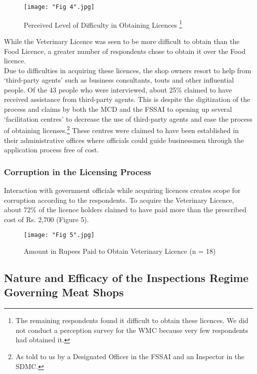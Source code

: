 \documentclass[a4paper, 12pt]{article}
\begin{document}
\begin{figure}[H]
\centering
\texttt{[image: "Fig 4".jpg]}
\caption[Perceived Level of Difficulty in Obtaining Licences] {Perceived Level of Difficulty in Obtaining Licences \footnote{The remaining respondents found it difficult to obtain these licences. We did not conduct a perception survey for the WMC because very few respondents had obtained it.}}
\end{figure} 


While the Veterinary Licence was seen to be more difficult to obtain than the Food Licence, a greater number of respondents chose to obtain it over the Food licence. \\

Due to difficulties in acquiring these licences, the shop owners resort to help from ‘third-party agents’ such as business consultants, touts and other influential people. Of the 43 people who were interviewed, about 25\% claimed to have received assistance from third-party agents. This is despite the digitization of the process and claims by both the MCD and the FSSAI to opening up several ‘facilitation centres’ to decrease the use of third-party agents and ease the process of obtaining licenses.\footnote{ As told to us by a Designated Officer in the FSSAI and an Inspector in the SDMC.} These centres were claimed to have been established in their administrative offices where officials could guide businessmen through the application process free of cost. \\

\subsubsection{Corruption in the Licensing Process}

Interaction with government officials while acquiring licences creates scope for corruption according to the respondents. To acquire the Veterinary Licence, about 72\% of the licence holders claimed to have paid more than the prescribed cost of Rs. 2,700 (Figure 5).\\

\begin{figure}[H]
\centering
\texttt{[image: "Fig 5".jpg]}
\caption[Optional Caption]{Amount in Rupees Paid to Obtain Veterinary Licence (n = 18)}
\end{figure} 

\subsection{Nature and Efficacy of the Inspections Regime Governing Meat Shops}
\end{document}
